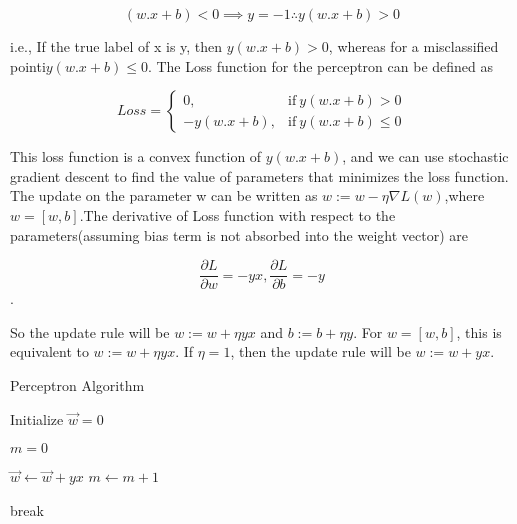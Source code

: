 \documentclass[12pt]{article}
\begin{document}
$$(w.x + b) < 0  \implies y = -1 \therefore y(w.x + b) > 0 $$
 
i.e., If the true label of x is y, then $y(w.x + b) > 0 $, whereas for a misclassified pointi$y(w.x + b) \leq 0 $. The Loss function  for the perceptron can be defined as 





\begin{equation} 
Loss=
\begin{cases}
0, & \text{if} \ y(w.x + b) > 0 
 \\
-y(w.x + b) , & \text{if} \ y(w.x + b) \leq 0 
\end{cases}
\end{equation}

This loss function is a convex function of $y(w.x + b)$, and we can use stochastic gradient descent to find the value of  parameters that minimizes the loss function.
The update on the parameter w can be written as $w := w - \eta \nabla L(w)$,where $w = [w,b]$.The derivative of Loss function with respect to the parameters(assuming bias term is not absorbed into the weight vector) are 

$$\frac{\partial L}{\partial w} = -yx , \frac{\partial L}{\partial b} = -y$$.

So the update rule will be $w := w + \eta yx $ and $b := b + \eta y$. For $w = [w,b]$, this is equivalent  to  $w := w + \eta yx $.
If $\eta = 1$, then the update rule will be  $w := w +  yx $.

\begin{algorithm}
	
	\caption*{Perceptron Algorithm} \label{alg:MyAlgorithm}
	\begin{algorithmic}
		\STATE Initialize $\vec{w} = 0$
		
		\STATE $m=0$
		
		
		\STATE $\vec{w} \leftarrow \vec{w} + yx$
		\STATE $m \leftarrow m + 1$
		
		\ENDIF
		\ENDFOR
		
		\STATE break
		
		\ENDIF
		
		
		
		\ENDWHILE
		
	\end{algorithmic}
\end{algorithm}
\end{document}

